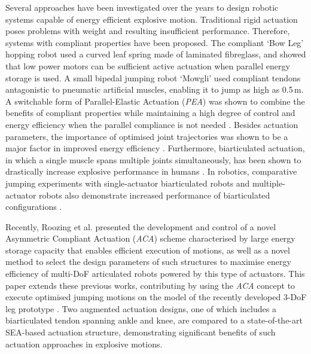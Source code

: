 \documentclass[letterpaper, 10 pt, conference]{ieeeconf}  %
\begin{document}
Several approaches have been investigated over the years to design robotic systems capable of energy efficient explosive motion. Traditional rigid actuation poses problems with weight and resulting insufficient performance. Therefore, systems with compliant properties have been proposed. The compliant `Bow Leg' hopping robot \cite{zeglin1999bow} used a curved leaf spring made of laminated fibreglass, and showed that low power motors can be sufficient active actuation when parallel energy storage is used. A small bipedal jumping robot `Mowgli' \cite{niiyama2007mowgli} used compliant tendons antagonistic to pneumatic artificial muscles, enabling it to jump as high as 0.5\,m. A switchable form of Parallel-Elastic Actuation (\textit{PEA}) was shown to combine the benefits of compliant properties while maintaining a high degree of control and energy efficiency when the parallel compliance is not needed \cite{liu2015spear}. Besides actuation parameters, the importance of optimised joint trajectories was shown to be a major factor in improved energy efficiency \cite{velasco2013soft, babivc2009biarticulated}. Furthermore, biarticulated actuation, in which a single muscle spans multiple joints simultaneously, has been shown to drastically increase explosive performance in humans \cite{schenau1989rotation,prilutsky1994tendon}. In robotics, comparative jumping experiments with single-actuator biarticulated robots and multiple-actuator robots also demonstrate increased performance of biarticulated configurations \cite{oshima2007jumping,babivc2009biarticulated,hyon2002development}.


Recently, Roozing et al. \cite{roozing2016development, roozing2016design, roozing_design_2018} presented the development and control of a novel Asymmetric Compliant Actuation (\textit{ACA}) scheme characterised by large energy storage capacity that enables efficient execution of motions, as well as a novel method to select the design parameters of such structures to maximise energy efficiency of multi-DoF articulated robots powered by this type of actuators. This paper extends these previous works, contributing by using the \textit{ACA} concept to execute optimised jumping motions on the model of the recently developed 3-DoF leg prototype \cite{roozing_design_2018}. Two augmented actuation designs, one of which includes a biarticulated tendon spanning ankle and knee, are compared to a state-of-the-art SEA-based actuation structure, demonstrating significant benefits of such actuation approaches in explosive motions.
\end{document}

